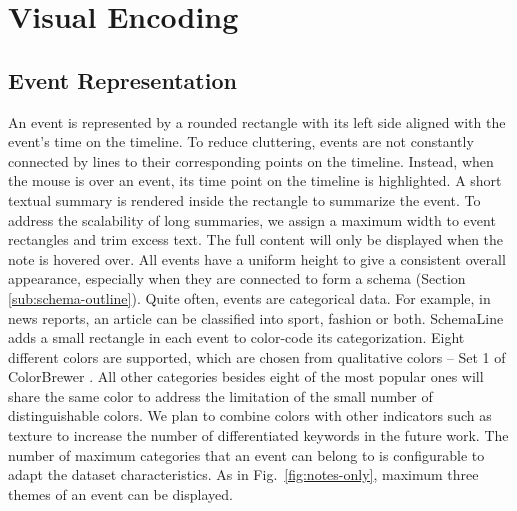 \section{Visual Encoding}
\label{sec:interface}

%
\subsection{Event Representation}
An event is represented by a rounded rectangle with its left side aligned with the event's time on the timeline. To reduce cluttering, events are not constantly connected by lines to their corresponding points on the timeline. Instead, when the mouse is over an event, its time point on the timeline is highlighted. A short textual summary is rendered inside the rectangle to summarize the event. To address the scalability of long summaries, we assign a maximum width to event rectangles and trim excess text. The full content will only be displayed when the note is hovered over. All events have a uniform height to give a consistent overall appearance, especially when they are connected to form a schema (Section \ref{sub:schema-outline}). Quite often, events are categorical data. For example, in news reports, an article can be classified into sport, fashion or both. SchemaLine adds a small rectangle in each event to color-code its categorization. Eight different colors are supported, which are chosen from qualitative colors -- Set 1 of ColorBrewer \cite{Harrower2003}. All other categories besides eight of the most popular ones will share the same color to address the limitation of the small number of distinguishable colors. We plan to combine colors with other indicators such as texture to increase the number of differentiated keywords in the future work. The number of maximum categories that an event can belong to is configurable to adapt the dataset characteristics. As in Fig.~\ref{fig:notes-only}, maximum three themes of an event can be displayed.

